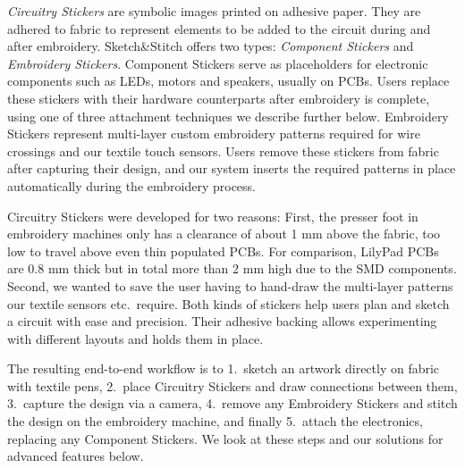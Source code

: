 \documentclass[header.tex]{subfiles}
\begin{document}
\textit{Circuitry Stickers} are symbolic images printed on adhesive paper. 
They are adhered to fabric to represent elements to be added to the circuit during and after embroidery. Sketch\&Stitch offers two types: \textit{Component Stickers} and \textit{Embroidery Stickers}. Component Stickers serve as placeholders for electronic components such as LEDs, motors and speakers, usually on PCBs. Users replace these stickers with their hardware counterparts after embroidery is complete, using one of three attachment techniques we describe further below. Embroidery Stickers represent multi-layer custom embroidery patterns required for wire crossings and our textile touch sensors. Users remove these stickers from fabric after capturing their design, and our system inserts the required patterns in place automatically during the embroidery process.

Circuitry Stickers were developed for two reasons: First, the presser foot in embroidery machines only has a clearance of about 1 mm above the fabric, too low to travel above even thin populated PCBs. For comparison, LilyPad PCBs are 0.8 mm thick but in total more than 2 mm high due to the SMD components. 
Second, we wanted to save the user having to hand-draw the multi-layer patterns our textile sensors etc.\ require. Both kinds of stickers help users plan and sketch a circuit with ease and precision. Their adhesive backing allows experimenting with different layouts and holds them in place. %


The resulting end-to-end workflow is to 1.\ sketch an artwork directly on fabric with textile pens, 2.\ place Circuitry Stickers and draw connections between them, 3.\ capture the design via a camera, 4.\ remove any Embroidery Stickers and stitch the design on the embroidery machine, and finally 5.\ attach the electronics, replacing any Component Stickers. We look at these steps and our solutions for advanced features below.

\end{document}

